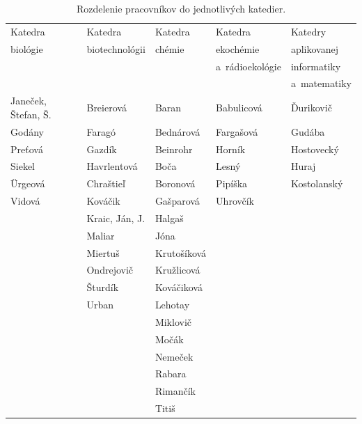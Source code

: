 \begin{table}
\centering\small
\begin{tabular}{lllll}
  \hline\noalign{\vspace{.3ex}}
  Katedra  & Katedra        & Katedra & Katedra         & Katedry      \\
  biológie & biotechnológii & chémie  & ekochémie       & aplikovanej  \\ 
           &                &         & a~rádioekológie & informatiky  \\ 
           &                &         &                 & a~matematiky \\[0.3ex]
  \hline\noalign{\vspace{.5ex}}
  Janeček, Štefan, Š. & Breierová      & Baran       & Babulicová & Ďurikovič   \\
  Godány              & Faragó         & Bednárová   & Fargašová  & Gudába      \\
  Preťová             & Gazdík         & Beinrohr    & Horník     & Hostovecký  \\
  Siekel              & Havrlentová    & Boča        & Lesný      & Huraj       \\
  Ürgeová             & Chraštieľ      & Boronová    & Pipíška    & Kostolanský \\[1ex]
  Vidová              & Kováčik        & Gašparová   & Uhrovčík   &             \\
                      & Kraic, Ján, J. & Halgaš      &            &             \\
                      & Maliar         & Jóna        &            &             \\
                      & Miertuš        & Krutošíková &            &             \\
                      & Ondrejovič     & Kružlicová  &            &             \\[1ex]
                      & Šturdík        & Kováčiková  &            &             \\
                      & Urban          & Lehotay     &            &             \\
                      &                & Miklovič    &            &             \\
                      &                & Močák       &            &             \\
                      &                & Nemeček     &            &             \\[1ex]
                      &                & Rabara      &            &             \\
                      &                & Rimančík    &            &             \\
                      &                & Titiš       &            &             \\[0.5ex]
  \hline
\end{tabular}
\caption{Rozdelenie pracovníkov do jednotlivých katedier.}
\label{tab:staffsort}
\end{table}


